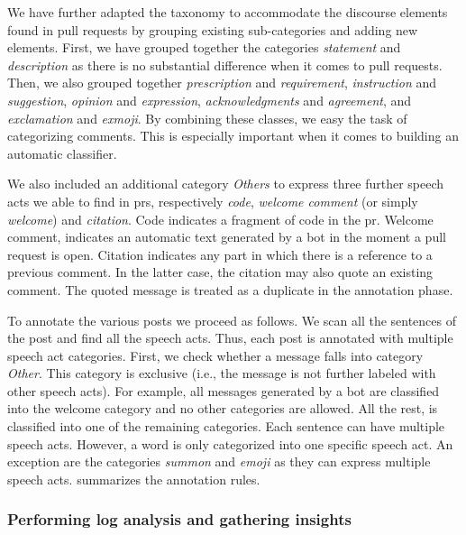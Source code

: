 

We have further adapted the taxonomy to accommodate the discourse elements found in pull requests by grouping existing sub-categories and adding new elements. First, we have grouped together the categories \emph{statement} and \emph{description} as there is no substantial difference when it comes to pull requests. Then, we also grouped together  \emph{prescription} and \emph{requirement}, \emph{instruction} and \emph{suggestion}, \emph{opinion} and \emph{expression},  \emph{acknowledgments} and \emph{agreement}, and \emph{exclamation} and \emph{exmoji}. By combining these classes, we easy the task of categorizing comments. This is especially important when it comes to building an automatic classifier. 

We also included an additional category \emph{Others} to express three further speech acts we able to find in \glspl{pr}, respectively \emph{code}, \emph{welcome comment} (or simply \emph{welcome}) and \emph{citation}. Code indicates a fragment of code in the \gls{pr}. Welcome comment, indicates an automatic text generated by a bot in the moment a pull request is open. Citation indicates any part in which there is a reference to a previous comment. In the latter case, the citation may also quote an existing comment. The quoted message is treated as a duplicate in the annotation phase. 

To annotate the various posts we proceed as follows. We scan all the sentences of the post and find all the speech acts. Thus, each post is annotated with multiple speech act categories. First, we check whether a message falls into category \emph{Other}. This category is exclusive (i.e., the message is not further labeled with other speech acts). For example, all messages generated by a bot are classified into the welcome category and no other categories are allowed. All the rest, is classified into one of the remaining categories. Each sentence can have multiple speech acts. However, a word is only categorized into one specific speech act. An exception are the categories \emph{summon} and \emph{emoji} as they can express multiple speech acts.  summarizes the annotation rules.



\subsubsection{Performing log analysis and gathering insights}

